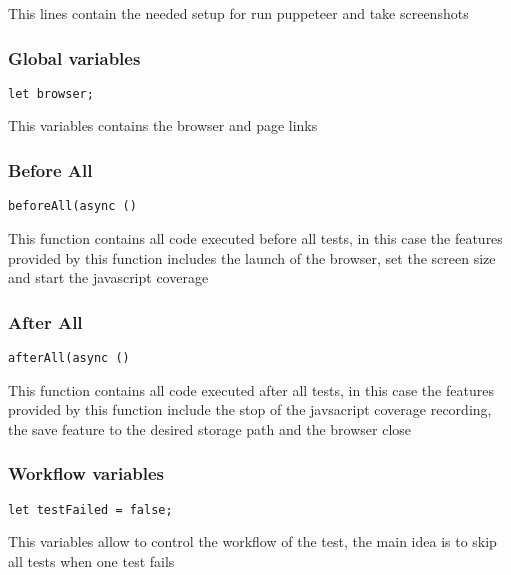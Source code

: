 \documentclass[a4paper]{article}
\begin{document}
This lines contain the needed setup for run puppeteer and take screenshots

\hypertarget{toc110}{}
\subsubsection{Global variables}

\begin{lstlisting}
let browser;
\end{lstlisting}

This variables contains the browser and page links

\hypertarget{toc111}{}
\subsubsection{Before All}

\begin{lstlisting}
beforeAll(async ()
\end{lstlisting}

This function contains all code executed before all tests, in this case the
features provided by this function includes the launch of the browser, set
the screen size and start the javascript coverage

\hypertarget{toc112}{}
\subsubsection{After All}

\begin{lstlisting}
afterAll(async ()
\end{lstlisting}

This function contains all code executed after all tests, in this case the
features provided by this function include the stop of the javsacript coverage
recording, the save feature to the desired storage path and the browser close

\hypertarget{toc113}{}
\subsubsection{Workflow variables}

\begin{lstlisting}
let testFailed = false;
\end{lstlisting}

This variables allow to control the workflow of the test, the main idea is to
skip all tests when one test fails

\hypertarget{toc114}{}
\end{document}
